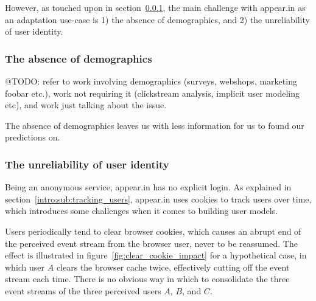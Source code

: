 However, as touched upon in section~\ref{}, the main challenge with appear.in as an adaptation use-case is 1) the absence of demographics, and 2) the unreliability of user identity.

\subsubsection{The absence of demographics}

@TODO: refer to work involving demographics (surveys, webshops, marketing foobar etc.), work not requiring it (clickstream analysis, implicit user modeling etc), and work just talking about the issue.

The absence of demographics leaves us with less information for us to found our predictions on.

\subsubsection{The unreliability of user identity}
\label{survey:unreliable_identity}

Being an anonymous service, appear.in has no explicit login. As explained in section~\ref{intro:sub:tracking_users}, appear.in uses cookies to track users over time, which introduces some challenges when it comes to building user models.

Users periodically tend to clear browser cookies, which causes an abrupt end of the perceived event stream from the browser user, never to be reassumed. The effect is illustrated in figure~\ref{fig:clear_cookie_impact} for a hypothetical case, in which user $A$ clears the browser cache twice, effectively cutting off the event stream each time. There is no obvious way in which to consolidate the three event streams of the three perceived users $A$, $B$, and $C$.

